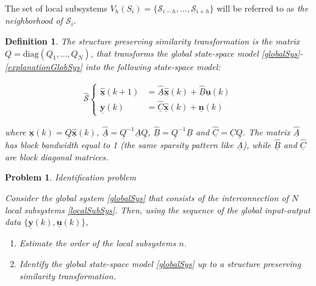 \documentclass[journal,10pt]{IEEEtran}
\newtheorem{definition}[thm]{Definition}
\newtheorem{problem}[thm]{Problem}
\begin{document}
\par
 The set of local subsystems $V_{h}(S_{i})=\{\mathcal{S}_{i-h},\ldots,\mathcal{S}_{i+h}\}$ will be referred to as \textit{the neighborhood of $\mathcal{S}_{i}$}. \\
\begin{definition}
\label{structurePreservingSimDef}
\textit{The structure preserving similarity transformation} is the matrix $\underline{Q}=\text{diag}(Q_{1},\ldots, Q_{N})$, that transforms the global state-space model \eqref{globalSys}-\eqref{explanationGlobSys} into the following state-space model:
\begin{small}
\begin{align}
\hat{\mathcal{S}} \left\{ \begin{array} {rl}
\hat{\underline{\mathbf{x}}}(k+1)&=\underline{\hat{A}}\hat{\underline{\mathbf{x}}}(k)+\hat{\underline{B}}\underline{\mathbf{u}}(k) \\
\underline{\mathbf{y}}(k)&=\hat{\underline{C}}\hat{\underline{\mathbf{x}}}(k)+\underline{\mathbf{n}}(k) \end{array} \right. \label{globalSysHat}
\end{align}
\end{small}
where $\underline{\mathbf{x}}(k)=\underline{Q}\hat{\underline{\mathbf{x}}}(k)$, $\underline{\hat{A}}=\underline{Q}^{-1} \underline{A}\underline{Q}$, $\hat{\underline{B}}=\underline{Q}^{-1} \underline{B}$ and $\hat{\underline{C}}= \underline{C}\underline{Q}$. The matrix $\underline{\hat{A}}$ has block bandwidth equal to 1 (the same sparsity pattern like $\underline{A}$), while $\hat{\underline{B}}$ and $\hat{\underline{C}}$ are block diagonal matrices.\\
\end{definition} 
\begin{problem} \textit{Identification problem} 
\par
Consider the global system \eqref{globalSys} that consists of the interconnection of $N$ local subsystems \eqref{localSubSys}. Then, using the sequence of the global input-output data $\{\underline{\mathbf{y}}(k),\underline{\mathbf{u}}(k) \} $,
\begin{enumerate}
\item Estimate the order of the local subsystems $n$.
\item Identify the global state-space model \eqref{globalSys} up to a structure preserving similarity transformation.
\end{enumerate} 
\label{identificationProblem}
\end{problem}
\end{document}
